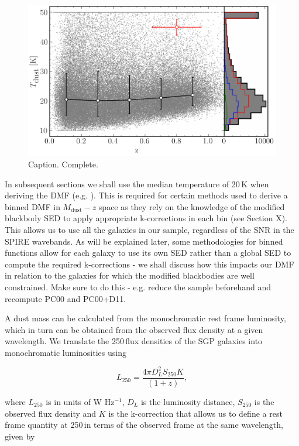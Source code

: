 \begin{figure}
	\centering
	\includegraphics[width=0.9\columnwidth]{Figures/dust_temperatures.pdf}
	\caption{Caption. {\color{red} Complete.}}
	\label{fig:dust_temperatures}
\end{figure}

In subsequent sections we shall use the median temperature of 20\,K when deriving the DMF (e.g. \citealt{Vlahakis_2005}). This is required for certain methods used to derive a binned DMF in $M_{\textrm{dust}}-z$ space as they rely on the knowledge of the modified blackbody SED to apply appropriate k-corrections in each bin (see Section {\color{red} X}). This allows us to use all the galaxies in our sample, regardless of the SNR in the SPIRE wavebands. As will be explained later, some methodologies for binned functions allow for each galaxy to use its own SED rather than a global SED to compute the required k-corrections - we shall discuss how this impacts our DMF in relation to the galaxies for which the modified blackbodies are well constrained. {\color{red} Make sure to do this - e.g. reduce the sample beforehand and recompute PC00 and PC00+D11.}

A dust mass can be calculated from the monochromatic rest frame luminosity, which in turn can be obtained from the observed flux density at a given wavelength. We translate the 250\,\micron flux densities of the SGP galaxies into monochromatic luminosities using

\begin{equation}
    L_{250} = \frac{4\pi D_L^2 S_{250}K}{(1+z)},
\label{eq:monohromatic_luminosities}
\end{equation}

\noindent where $L_{250}$ is in units of W Hz$^{-1}$, $D_L$ is the luminosity distance, $S_{250}$ is the observed flux density and $K$ is the k-correction that allows us to define a rest frame quantity at 250\,\micron in terms of the observed frame at the same wavelength, given by

